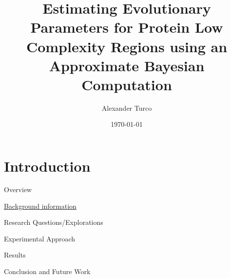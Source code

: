 \documentclass{beamer}
\title[BEAP Dec 2022]{Estimating Evolutionary Parameters for Protein Low Complexity Regions using an Approximate Bayesian Computation}
\author{Alexander Turco}
\date{\today}
\begin{document}
	
	\section{Introduction}
	\begin{frame}
		\titlepage 
	\end{frame}
	
	\logo{}
	
	\begin{frame}{Overview}
		
		\begin{center}
		\begin{minipage}{6cm}
				
		  		\begin{block}{} \hyperlink{link1}{Background information} \end{block}
		  		\begin{block}{} Research Questions/Explorations \end{block}
		  		\begin{block}{} Experimental Approach \end{block}
		  		\begin{block}{} Results \end{block}
		  		\begin{block}{} Conclusion and Future Work \end{block}

		\end{minipage}
		\end{center}
	
	\end{frame}
	
\end{document}
